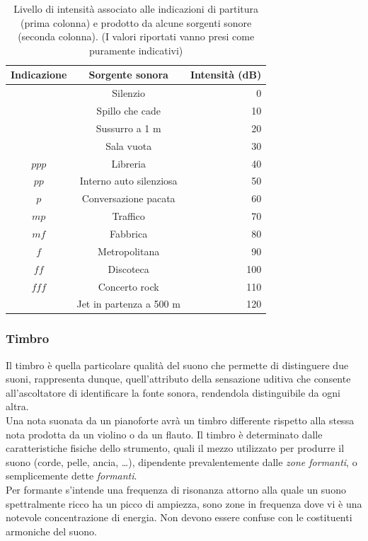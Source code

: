 \documentclass[12pt]{report}
\begin{document}
\begin{table}[h]
\begin{center}
\begin{tabular}{|c|c|r|}
\hline
{\bfseries Indicazione} & Sorgente sonora & Intensità (dB) \\
\hline
& Silenzio & 0 \\

& Spillo che cade & 10\\

& Sussurro a 1 m & 20\\

& Sala vuota & 30\\

$ppp$ & Libreria & 40\\

$pp$ & Interno auto silenziosa & 50\\

$p$ & Conversazione pacata & 60\\

$mp$ & Traffico & 70\\

$mf$ & Fabbrica & 80\\

$f$ & Metropolitana & 90\\

$ff$ & Discoteca & 100\\

$fff$ & Concerto rock & 110\\

& Jet in partenza a 500 m & 120\\
\hline
\end{tabular}
\end{center}
\caption{Livello di intensità associato alle indicazioni di partitura (prima colonna) e prodotto da alcune sorgenti sonore (seconda colonna). (I valori riportati vanno presi come puramente indicativi)}
\label{tab:decibel}
\end{table}
	
		\subsubsection{Timbro}
		\label{cap2sec1_1_4}	
		Il timbro è quella particolare qualità del suono che permette di distinguere due suoni, rappresenta dunque, quell'attributo della sensazione uditiva che consente all'ascoltatore di identificare la fonte sonora, rendendola distinguibile da ogni altra.\\
Una nota suonata da un pianoforte avrà un timbro differente rispetto alla stessa nota prodotta da un violino o da un flauto.
Il timbro è determinato dalle caratteristiche fisiche dello strumento, quali il mezzo utilizzato per produrre il suono (corde, pelle, ancia, \dots), dipendente prevalentemente dalle {\itshape zone formanti}, o semplicemente dette {\itshape formanti}.\\
Per formante s'intende una frequenza di risonanza attorno alla quale un suono spettralmente ricco ha un picco di ampiezza, sono zone in frequenza dove vi è una notevole concentrazione di energia. Non devono essere confuse con le costituenti armoniche del suono.\\
\end{document}
